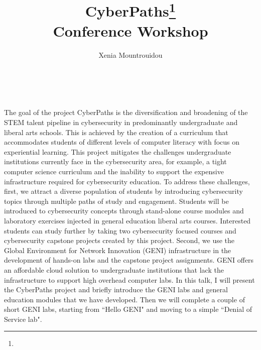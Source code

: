 \documentclass{article}
\title{CyberPaths\footnote{
\protect}\\
\vspace{0.2in}
\large Conference Workshop\\}
\author{
Xenia Mountrouidou\\
\affaddr{Department of Computer Science}\\
\affaddr{College of Charleston}\\
\email{mountrouidoux@cofc.edu}
}
\begin{document}
\maketitle

The goal of the project CyberPaths is the diversification and broadening of
the STEM talent pipeline in cybersecurity in predominantly undergraduate and
liberal arts schools. This is achieved by the creation of a curriculum that
accommodates students of different levels of computer literacy with focus on
experiential learning. This project mitigates the challenges undergraduate
institutions currently face in the cybersecurity area, for example, a tight
computer science curriculum and the inability to support the expensive
infrastructure required for cybersecurity education. To address these
challenges, first, we attract a diverse population of students by introducing
cybersecurity topics through multiple paths of study and engagement. Students
will be introduced to cybersecurity concepts through stand-alone course modules
and laboratory exercises injected in general education liberal arts courses.
Interested students can study further by taking two cybersecurity focused
courses and cybersecurity capstone projects created by this project. Second,
we use the Global Environment for Network Innovation (GENI) infrastructure in
the development of hands-on labs and the capstone project assignments. GENI
offers an affordable cloud solution to undergraduate institutions that lack the
infrastructure to support high overhead computer labs. In this talk, I will
present the CyberPaths project and briefly introduce the GENI labs and general
education modules that we have developed. Then we will complete a couple of
short GENI labs, starting from ``Hello GENI" and moving to a simple
``Denial of Service lab".
\end{document}
